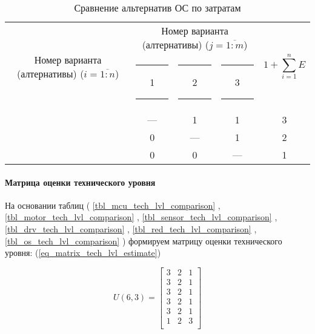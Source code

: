 \begin{table}[H]
    \centering
    \begin{tabular}{|c|c|c|c|c|}
        \hline
        \multirow{2}{2.4cm}[-0.5pc]{
            \centering
            Номер варианта (алтернативы) ($i = \overline{1:n}$)
        } &
        \multicolumn{3}{c|}{
            \parbox[t]{2.4cm}{
                \centering
                Номер варианта (алтернативы) ($j = \overline{1:m}$)
            }
        } &
        \multirow{2}{1.7cm}{
            \centering
            $$1 + \sum_{i=1}^n E$$
        } \\
        &
        \centering \rule{2pt}{0pt} 1 \rule{2pt}{0pt} &
        \centering \rule{2pt}{0pt} 2 \rule{2pt}{0pt} &
        \centering \rule{2pt}{0pt} 3 \rule{2pt}{0pt} & \\
        \hline \hline
        \centering{1} &---& 1 & 1 & 3 \\ \hline
        \centering{2} & 0 &---& 1 & 2 \\ \hline
        \centering{3} & 0 & 0 &---& 1 \\ \hline
    \end{tabular}
    \caption{Сравнение альтернатив ОС по затратам}
    \label{tbl_os_cost_lvl_comparison}
\end{table}


\paragraph{Матрица оценки технического уровня}

На основании таблиц (
    \ref{tbl_mcu_tech_lvl_comparison}
  , \ref{tbl_motor_tech_lvl_comparison}
  , \ref{tbl_sensor_tech_lvl_comparison}
  , \ref{tbl_drv_tech_lvl_comparison}
  , \ref{tbl_red_tech_lvl_comparison}
  , \ref{tbl_os_tech_lvl_comparison}
)
формируем матрицу оценки технического уровня:
(\ref{eq_matrix_tech_lvl_estimate})

\begin{equation}
    U(6,3) =
    \begin{bmatrix}
        3 & 2 & 1 \\
        3 & 2 & 1 \\
        3 & 2 & 1 \\
        3 & 2 & 1 \\
        3 & 2 & 1 \\
        1 & 2 & 3 \\
    \end{bmatrix}
    \label{eq_matrix_tech_lvl_estimate}
\end{equation}

